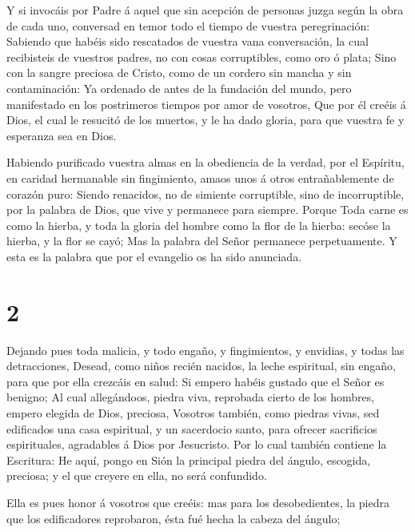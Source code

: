  Y si invocáis por Padre á aquel que sin acepción de
personas juzga según la obra de cada uno, conversad en temor todo el
tiempo de vuestra peregrinación:  Sabiendo que habéis sido
rescatados de vuestra vana conversación, la cual recibisteis de vuestros
padres, no con cosas corruptibles, como oro ó plata;  Sino
con la sangre preciosa de Cristo, como de un cordero sin mancha y sin
contaminación:  Ya ordenado de antes de la fundación del
mundo, pero manifestado en los postrimeros tiempos por amor de vosotros,
 Que por él creéis á Dios, el cual le resucitó de los
muertos, y le ha dado gloria, para que vuestra fe y esperanza sea en
Dios.

 Habiendo purificado vuestra almas en la obediencia de la
verdad, por el Espíritu, en caridad hermanable sin fingimiento, amaos
unos á otros entrañablemente de corazón puro:  Siendo
renacidos, no de simiente corruptible, sino de incorruptible, por la
palabra de Dios, que vive y permanece para siempre.  Porque
Toda carne es como la hierba, y toda la gloria del hombre como la flor
de la hierba: secóse la hierba, y la flor se cayó;  Mas la
palabra del Señor permanece perpetuamente. Y esta es la palabra que por
el evangelio os ha sido anunciada.

\hypertarget{section-1}{%
\section{2}\label{section-1}}

 Dejando pues toda malicia, y todo engaño, y fingimientos, y
envidias, y todas las detracciones,  Desead, como niños
recién nacidos, la leche espiritual, sin engaño, para que por ella
crezcáis en salud:  Si empero habéis gustado que el Señor es
benigno;  Al cual allegándoos, piedra viva, reprobada cierto
de los hombres, empero elegida de Dios, preciosa,  Vosotros
también, como piedras vivas, sed edificados una casa espiritual, y un
sacerdocio santo, para ofrecer sacrificios espirituales, agradables á
Dios por Jesucristo.  Por lo cual también contiene la
Escritura: He aquí, pongo en Sión la principal piedra del ángulo,
escogida, preciosa; y el que creyere en ella, no será confundido.

 Ella es pues honor á vosotros que creéis: mas para los
desobedientes, la piedra que los edificadores reprobaron, ésta fué hecha
la cabeza del ángulo;

